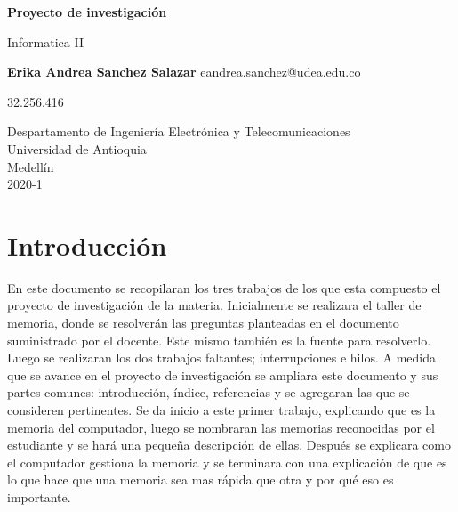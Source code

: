 \documentclass{article}
\begin{document}
\begin{titlepage}
    \begin{center}
        \vspace*{1cm}
            
        \Huge
        \textbf{Proyecto de investigación}
            
        \vspace{0.5cm}
        \LARGE
        Informatica II
            
        \vspace{1.5cm}
            
        \textbf{Erika Andrea Sanchez Salazar}
        \LARGE
         eandrea.sanchez@udea.edu.co
         
        32.256.416
        \vfill
            
        \vspace{0.8cm}
            
        \Large
        Despartamento de Ingeniería Electrónica y Telecomunicaciones\\
        Universidad de Antioquia\\
        Medellín\\
         2020-1
            
    \end{center}
\end{titlepage}

\tableofcontents
\newpage
\section{Introducción}\label{intro}
\vspace{0.5cm}
\noindent
En este documento se recopilaran los tres trabajos de los que esta compuesto el proyecto de investigación de la materia. 
\vspace{0.5cm}
\noindent
Inicialmente se realizara el taller de memoria, donde se resolverán las preguntas planteadas en el documento suministrado por el docente. Este mismo también es la fuente para resolverlo. Luego se realizaran los dos trabajos faltantes; interrupciones e hilos.
\noindent
\vspace{0.5cm}
A medida que se avance en el proyecto de investigación se ampliara este documento y sus partes comunes: introducción, índice, referencias y se agregaran las que se consideren pertinentes.
\noindent
\vspace{0.5cm}
Se da inicio a este primer trabajo, explicando que es la memoria del computador, luego se nombraran las memorias reconocidas por el estudiante y se hará una pequeña descripción de ellas. Después se explicara como el computador gestiona la memoria y se terminara con una explicación de que es lo que hace que una memoria sea mas rápida que otra y por qué eso es importante. 
\end{document}
